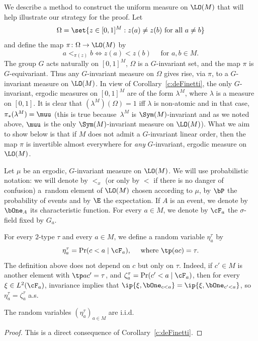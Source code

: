 We describe a method to construct the uniform measure on $\LO(M)$ that will help illustrate our strategy for the proof. Let
\begin{equation*}
\Omega = \set{z \in [0, 1]^M : z(a) \neq z(b) \text{ for all } a \neq b}
\end{equation*}
and define the map $\pi \colon \Omega \to \LO(M)$ by
\begin{equation}
\label{eq:def-pi}
a <_{\pi(z)} b \iff z(a) < z(b) \quad \text{ for } a, b \in M.
\end{equation}
The group $G$ acts naturally on $[0, 1]^M$, $\Omega$ is a $G$-invariant set, and the map $\pi$ is $G$\nobreakdash-equivariant. Thus any $G$-invariant measure on $\Omega$ gives rise, via $\pi$, to a $G$-invariant measure on $\LO(M)$. In view of Corollary~\ref{c:deFinetti}, the only $G$-invariant, ergodic measures on $[0, 1]^M$ are of the form $\lambda^M$, where $\lambda$ is a measure on $[0, 1]$. It is clear that \hbox{$(\lambda^M)(\Omega) = 1$} iff $\lambda$ is non-atomic and in that case, $\pi_*(\lambda^M) = \muu$ (this is true because~$\lambda^M$ is $\Sym(M)$-invariant and as we noted above, $\muu$ is the only $\Sym(M)$-invariant measure on $\LO(M)$). What we aim to show below is that if $M$ does not admit a $G$-invariant linear order, then the map $\pi$ is invertible almost everywhere for \emph{any} $G$-invariant, ergodic measure on $\LO(M)$.

Let $\mu$ be an ergodic, $G$-invariant measure on $\LO(M)$. We will use probabilistic notation: we will denote by $<_x$ (or only by $<$ if there is no danger of confusion) a~random element of $\LO(M)$ chosen according to $\mu$, by $\bP$ the probability of events and by $\E$ the expectation. If $A$ is an event, we denote by $\bOne_A$ its characteristic function. For every $a \in M$, we denote by $\cF_a$ the $\sigma$-field fixed by $G_a$.

For every $2$-type $\tau$ and every $a \in M$, we define a random variable $\eta^\tau_a$ by
\begin{equation*}
\eta^\tau_a = \Pr(c < a \mid \cF_a), \quad \text{ where } \tp(ac) = \tau.
\end{equation*}
The definition above does not depend on $c$ but only on $\tau$. Indeed, if $c' \in M$ is another element with $\tp ac' = \tau$, and $\zeta_a^{\tau} = \Pr(c' < a \mid \cF_a)$, then for every $\xi \in L^2(\cF_a)$, invariance implies that $\ip{\xi, \bOne_{c < a}} = \ip{\xi, \bOne_{c' < a}}$, so $\eta_a^\tau = \zeta_a^\tau$ a.s.

\pagebreak[2]
\begin{lemma}
\label{Lem:i.i.d.}
The random variables $(\eta^\tau_a)_{a\in M}$ are i.i.d.
\end{lemma}
\begin{proof}
This is a direct consequence of Corollary~\ref{c:deFinetti}.
\end{proof}

